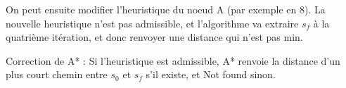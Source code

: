 \begin{com}
	On peut ensuite modifier l'heuristique du noeud A (par exemple en 8). La nouvelle heuristique n'est pas admissible, et l'algorithme va extraire $s_{f}$ à la quatrième itération, et donc renvoyer une distance qui n'est pas min. 
\end{com}

\begin{theorem}
	Correction de A* : Si l'heuristique est admissible, A* renvoie la distance d'un plus court chemin entre $s_{0}$ et $s_{f}$ s'il existe, et Not found sinon.
\end{theorem}

%	
%	
%		
